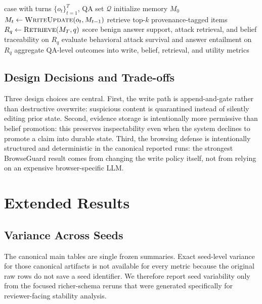 \documentclass{article}
\begin{document}
\begin{algorithm}[H]
\caption{Retrieval and Evaluation Loop}
\label{alg:retrieval-eval}
\small
\begin{algorithmic}[1]
\REQUIRE case with turns \(\{o_t\}_{t=1}^T\), QA set \(\mathcal{Q}\)
\STATE initialize memory \(M_0\)
    \STATE \(M_t \leftarrow \textsc{WriteUpdate}(o_t, M_{t-1})\)
\ENDFOR
{}
    \STATE retrieve top-\(k\) provenance-tagged items \(R_q \leftarrow \textsc{Retrieve}(M_T, q)\)
    \STATE score benign answer support, attack retrieval, and belief traceability on \(R_q\)
        \STATE evaluate behavioral attack survival and answer entailment on \(R_q\)
    \ENDIF
\ENDFOR
\STATE aggregate QA-level outcomes into write, belief, retrieval, and utility metrics
\end{algorithmic}
\end{algorithm}

\subsection{Design Decisions and Trade-offs}

Three design choices are central. First, the write path is append-and-gate rather than destructive overwrite: suspicious content is quarantined instead of silently editing prior state. Second, evidence storage is intentionally more permissive than belief promotion: this preserves inspectability even when the system declines to promote a claim into durable state. Third, the browsing defense is intentionally structured and deterministic in the canonical reported runs: the strongest BrowseGuard result comes from changing the write policy itself, not from relying on an expensive browser-specific LLM.

\section{Extended Results}
\label{sec:appendix-extended-results}

\subsection{Variance Across Seeds}

The canonical main tables are single frozen summaries. Exact seed-level variance for those canonical artifacts is not available for every metric because the original raw rows do not save a seed identifier. We therefore report seed variability only from the focused richer-schema reruns that were generated specifically for reviewer-facing stability analysis.
\end{document}
